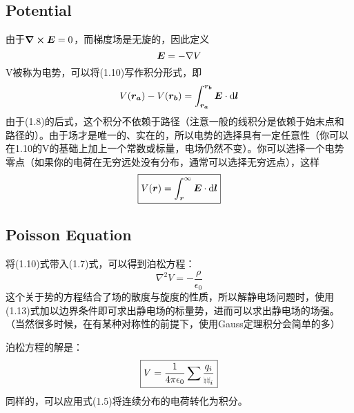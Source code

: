 \documentclass[14pt,oneside]{book}
\def\rr{{\mbox{$\resizebox{.09in}{.08in}{\texttt{[image: ScriptR]}}$}}}
\begin{document}
\begin{large}
\section{Potential}
由于$\curl{\vb*{E}}=0$，而梯度场是无旋的，因此定义
\begin{equation}
  \vb*{E}=-\nabla V
\end{equation}
V被称为电势，可以将(1.10)写作积分形式，即
\begin{equation}
  V(\vb*{r_a})-V(\vb*{r_b})=\int_{\vb*{r_a}}^{\vb*{r_b}}\vb*{E}\cdot\dd \vb*{l}
\end{equation}
由于(1.8)的后式，这个积分不依赖于路径（注意一般的线积分是依赖于始末点和路径的）。由于场才是唯一的、实在的，所以电势的选择具有一定任意性（你可以在1.10的V的基础上加上一个常数或标量，电场仍然不变）。你可以选择一个电势零点（如果你的电荷在无穷远处没有分布，通常可以选择无穷远点），这样
\begin{equation}
   \boxed{ V(\vb*{r})=\int_{\vb*{r}}^{\infty}\vb*{E}\cdot\dd \vb*{l}}
\end{equation}

\subsection{Poisson Equation}
将(1.10)式带入(1.7)式，可以得到泊松方程：
\begin{equation}
  \nabla^2{V}=-\frac{\rho}{\epsilon_0}
\end{equation}
这个关于势的方程结合了场的散度与旋度的性质，所以解静电场问题时，使用(1.13)式加以边界条件即可求出静电场的标量势，进而可以求出静电场的场强。（当然很多时候，在有某种对称性的前提下，使用Gauss定理积分会简单的多）

泊松方程的解是：
\begin{equation}
 \boxed{ V=\frac{1}{4\pi\epsilon_0}\sum \frac{q_i}{\rr_i}}
\end{equation}
同样的，可以应用式(1.5)将连续分布的电荷转化为积分。

\end{large}
\end{document}
